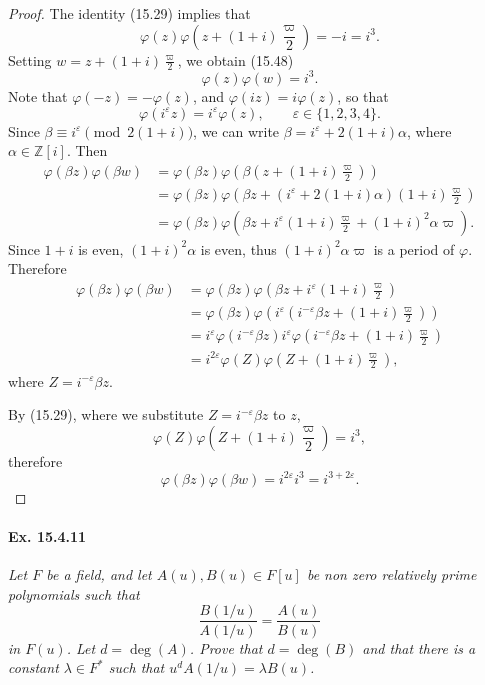 \documentclass[11pt,a4paper]{article}
\newcommand{\Z}{\mathbb{Z}}
\begin{document}
\begin{proof} 
The identity (15.29) implies that
$$\varphi(z) \varphi\left(z + (1+i)\frac{\varpi}{2} \right) = -i = i^3.$$
Setting $w = z + (1+i)\frac{\varpi}{2}$, we obtain (15.48)
$$\varphi(z) \varphi(w) = i^3.$$
Note that $\varphi(-z) = - \varphi(z)$, and $\varphi(iz) = i \varphi(z)$, so that
$$\varphi(i^\varepsilon z) = i^\varepsilon \varphi(z), \qquad \varepsilon \in\{1,2,3,4\}.$$
Since $\beta \equiv i^\varepsilon \pmod {2(1+i)}$, we can write $\beta = i^\varepsilon + 2(1+i) \alpha$, where $\alpha \in \Z[i]$. Then
\begin{align*}
\varphi(\beta z) \varphi(\beta w) &= \varphi(\beta z)\varphi\left(\beta\left (z + (1+i)\frac{\varpi}{2}\right)\right)\\
&=\varphi(\beta z) \varphi\left(\beta z + (i^\varepsilon + 2(1+i) \alpha )(1+i)\frac{\varpi}{2}\right)\\
&=\varphi(\beta z) \varphi\left(\beta z + i^\varepsilon (1+i)\frac{\varpi}{2} + (1+i)^2 \alpha \varpi\right).
\end{align*}
Since $1+i$ is even, $(1+i)^2 \alpha$ is even, thus $(1+i)^2 \alpha \varpi$ is a period of $\varphi$. Therefore
\begin{align*}
\varphi(\beta z) \varphi(\beta w) &=\varphi(\beta z) \varphi\left(\beta z + i^\varepsilon (1+i)\frac{\varpi}{2} \right)\\
&=\varphi(\beta z) \varphi\left(i^\varepsilon\left( i^{-\varepsilon}\beta z +  (1+i)\frac{\varpi}{2}\right) \right)\\
&=i^{\varepsilon} \varphi\left( i^{-\varepsilon} \beta z\right) i^\varepsilon  \varphi\left( i^{-\varepsilon}\beta z +  (1+i)\frac{\varpi}{2} \right)\\
&= i^{2\varepsilon} \varphi(Z) \varphi\left(Z + (1+i)\frac{\varpi}{2} \right),
\end{align*}
where $Z = i^{-\varepsilon} \beta z$. 

By (15.29), where we substitute $Z= i^{-\varepsilon} \beta z$ to $z$,
$$\varphi(Z) \varphi\left(Z + (1+i)\frac{\varpi}{2} \right)= i^3,$$
therefore
$$\varphi(\beta z) \varphi(\beta w) = i^{2\varepsilon} i^3 = i^{3 + 2 \varepsilon}.$$
\end{proof}

\paragraph{Ex. 15.4.11}{\it  Let $F$ be a field, and let $A(u),B(u) \in F[u]$ be non zero relatively prime polynomials such that
$$\frac{B(1/u)}{A(1/u)} = \frac{A(u)}{B(u)}$$
in $F(u)$. Let $d = \deg(A)$. Prove that $d = \deg(B)$ and that there is a constant $\lambda \in F^*$ such that $u^dA(1/u) = \lambda B(u)$.
}
\end{document}
